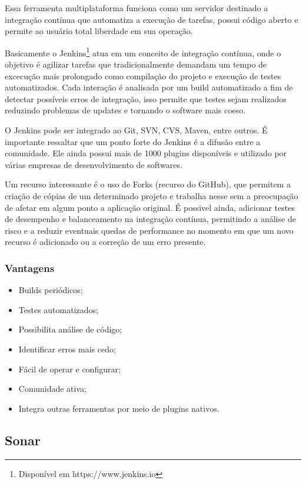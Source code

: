 Essa ferramenta multiplataforma funciona como um servidor destinado a integração contínua que automatiza a execução de tarefas, possui código aberto e permite ao usuário total liberdade em sua operação.

Basicamente o Jenkins\footnote{Disponível em https://www.jenkins.io} atua em um conceito de integração contínua, onde o objetivo é agilizar tarefas que tradicionalmente demandam um tempo de excecução mais prolongado como compilação do projeto e execução de testes automatizados. Cada interação é analisada por um build automatizado a fim de detectar possíveis erros de integração, isso permite que testes sejam realizados reduzindo problemas de updates e tornando o software mais coeso.\cite{atalay}

O Jenkins pode ser integrado ao Git, SVN, CVS, Maven, entre outros. É importante ressaltar que um ponto forte do Jenkins é a difusão entre a comunidade. Ele ainda possui mais de 1000 plugins disponíveis e utilizado por várias empresas de desenvolvimento de softwares.

Um recurso interessante é o uso de Forks (recurso do GitHub), que permitem a criação de cópias de um determinado projeto e trabalha nesse sem a preocupação de afetar em algum ponto a aplicação original. É possivel ainda, adicionar testes de desempenho e balanceamento na integração contínua, permitindo a análise de risco e a reduzir eventuais quedas de performance no momento em que um novo recurso é adicionado ou a correção de um erro presente.

\subsubsection{Vantagens}
\begin{itemize}
\item Builds periódicos;
\item Testes automatizados;
\item Possibilita análise de código;
\item Identificar erros mais cedo;
\item Fácil de operar e configurar;
\item Comunidade ativa;
\item Integra outras ferramentas por meio de plugins nativos.
\end{itemize}

\subsection{Sonar}

